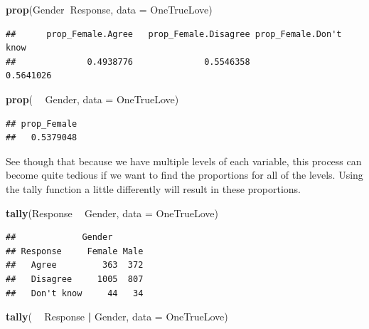 \documentclass[]{book}
\newenvironment{Shaded}{\begin{snugshade}}{\end{snugshade}}
\newcommand{\DataTypeTok}[1]{\textcolor[rgb]{0.13,0.29,0.53}{#1}}
\newcommand{\KeywordTok}[1]{\textcolor[rgb]{0.13,0.29,0.53}{\textbf{#1}}}
\newcommand{\NormalTok}[1]{#1}
\newcommand{\OperatorTok}[1]{\textcolor[rgb]{0.81,0.36,0.00}{\textbf{#1}}}
\newcommand{\StringTok}[1]{\textcolor[rgb]{0.31,0.60,0.02}{#1}}
\begin{document}
\begin{Shaded}
\begin{Highlighting}[]
\KeywordTok{prop}\NormalTok{(Gender}\OperatorTok{~}\NormalTok{Response, }\DataTypeTok{data =}\NormalTok{ OneTrueLove)}
\end{Highlighting}
\end{Shaded}

\begin{verbatim}
##      prop_Female.Agree   prop_Female.Disagree prop_Female.Don't know 
##              0.4938776              0.5546358              0.5641026
\end{verbatim}

\begin{Shaded}
\begin{Highlighting}[]
\KeywordTok{prop}\NormalTok{( }\OperatorTok{~}\StringTok{ }\NormalTok{Gender, }\DataTypeTok{data =}\NormalTok{ OneTrueLove)}
\end{Highlighting}
\end{Shaded}

\begin{verbatim}
## prop_Female 
##   0.5379048
\end{verbatim}

See though that because we have multiple levels of each variable, this process can become quite tedious if we want to find the proportions for all of the levels. Using the tally function a little differently will result in these proportions.

\begin{Shaded}
\begin{Highlighting}[]
\KeywordTok{tally}\NormalTok{(Response }\OperatorTok{~}\StringTok{ }\NormalTok{Gender, }\DataTypeTok{data =}\NormalTok{ OneTrueLove)}
\end{Highlighting}
\end{Shaded}

\begin{verbatim}
##             Gender
## Response     Female Male
##   Agree         363  372
##   Disagree     1005  807
##   Don't know     44   34
\end{verbatim}

\begin{Shaded}
\begin{Highlighting}[]
\KeywordTok{tally}\NormalTok{( }\OperatorTok{~}\StringTok{ }\NormalTok{Response }\OperatorTok{|}\StringTok{ }\NormalTok{Gender, }\DataTypeTok{data =}\NormalTok{ OneTrueLove)}
\end{Highlighting}
\end{Shaded}
\end{document}
